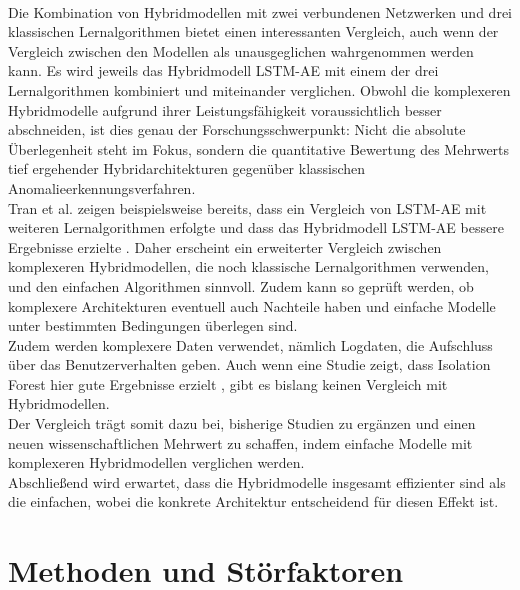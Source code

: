 \documentclass[a4paper,12pt]{article}
\begin{document}
	\\[0.5em]
	Die Kombination von Hybridmodellen mit zwei verbundenen Netzwerken und drei klassischen Lernalgorithmen bietet einen interessanten Vergleich, auch wenn der Vergleich zwischen den Modellen als unausgeglichen wahrgenommen werden kann. Es wird jeweils das Hybridmodell LSTM-AE mit einem der drei Lernalgorithmen kombiniert und miteinander verglichen. Obwohl die komplexeren Hybridmodelle aufgrund ihrer Leistungsfähigkeit voraussichtlich besser abschneiden, ist dies genau der Forschungsschwerpunkt: Nicht die absolute Überlegenheit steht im Fokus, sondern die quantitative Bewertung des Mehrwerts tief ergehender Hybridarchitekturen gegenüber klassischen Anomalieerkennungsverfahren.
	\\[0.5em]
	Tran et al. zeigen beispielsweise bereits, dass ein Vergleich von LSTM-AE mit weiteren Lernalgorithmen erfolgte und dass das Hybridmodell LSTM-AE bessere Ergebnisse erzielte \cite{tran2021forecasting}. Daher erscheint ein erweiterter Vergleich zwischen komplexeren Hybridmodellen, die noch klassische Lernalgorithmen verwenden, und den einfachen Algorithmen sinnvoll. Zudem kann so geprüft werden, ob komplexere Architekturen eventuell auch Nachteile haben und einfache Modelle unter bestimmten Bedingungen überlegen sind.
	\\[0.5em]
	Zudem werden komplexere Daten verwendet, nämlich Logdaten, die Aufschluss über das Benutzerverhalten geben. Auch wenn eine Studie zeigt, dass Isolation Forest hier gute Ergebnisse erzielt \cite{yan2021extended}, gibt es bislang keinen Vergleich mit Hybridmodellen.
	\\[0.5em]
	Der Vergleich trägt somit dazu bei, bisherige Studien zu ergänzen und einen neuen wissenschaftlichen Mehrwert zu schaffen, indem einfache Modelle mit komplexeren Hybridmodellen verglichen werden.
	\\[0.5em]
	Abschließend wird erwartet, dass die Hybridmodelle insgesamt effizienter sind als die einfachen, wobei die konkrete Architektur entscheidend für diesen Effekt ist.
	
	\section{Methoden und Störfaktoren}
\end{document}

